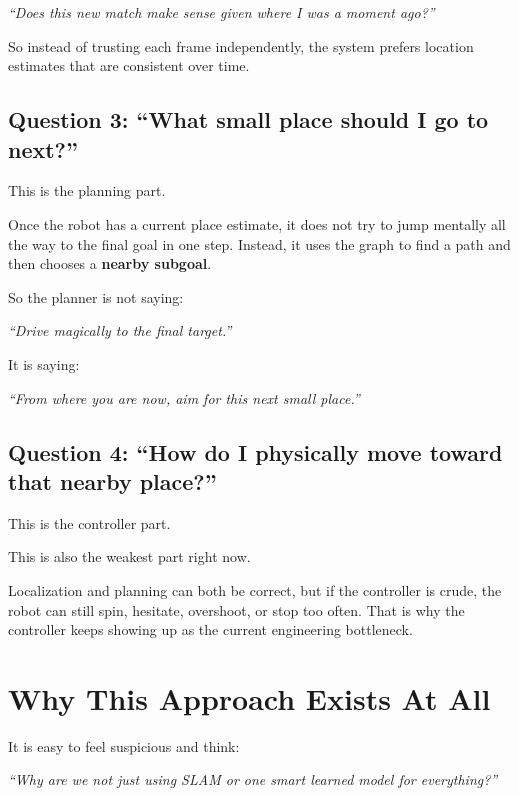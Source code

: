 \documentclass[11pt,a4paper]{article}
\begin{document}
\begin{center}
\textit{``Does this new match make sense given where I was a moment ago?''}
\end{center}

So instead of trusting each frame independently, the system prefers location
estimates that are consistent over time.

\subsection{Question 3: ``What small place should I go to next?''}

This is the planning part.

Once the robot has a current place estimate, it does not try to jump mentally
all the way to the final goal in one step.  Instead, it uses the graph to find
a path and then chooses a \textbf{nearby subgoal}.

So the planner is not saying:

\begin{center}
\textit{``Drive magically to the final target.''}
\end{center}

It is saying:

\begin{center}
\textit{``From where you are now, aim for this next small place.''}
\end{center}

\subsection{Question 4: ``How do I physically move toward that nearby place?''}

This is the controller part.

This is also the weakest part right now.

Localization and planning can both be correct, but if the controller is crude,
the robot can still spin, hesitate, overshoot, or stop too often.  That is why
the controller keeps showing up as the current engineering bottleneck.

\section{Why This Approach Exists At All}

It is easy to feel suspicious and think:

\begin{center}
\textit{``Why are we not just using SLAM or one smart learned model for everything?''}
\end{center}
\end{document}
